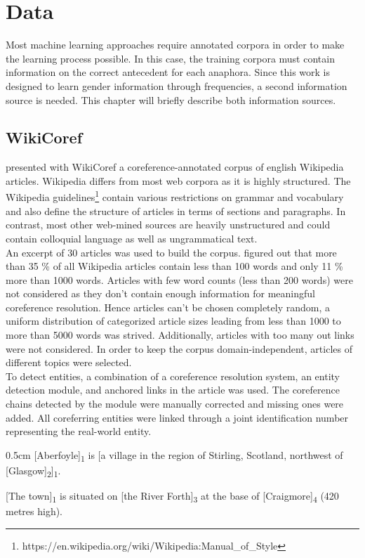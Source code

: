 \chapter{Data}
\label{sec:Data}

Most machine learning approaches require annotated corpora in order to make the learning process possible. In this case, the training corpora must contain information on the correct antecedent for each anaphora. Since this work is designed to learn gender information through frequencies, a second information source is needed. This chapter will briefly describe both information sources.

\section{WikiCoref }
\cite{wikicoref2016} presented with WikiCoref a coreference-annotated corpus of english Wikipedia articles. Wikipedia differs from most web corpora as it is highly structured. The Wikipedia guidelines\footnote{https://en.wikipedia.org/wiki/Wikipedia:Manual\_of\_Style} contain various restrictions on grammar and vocabulary and also define the structure of articles in terms of sections and paragraphs. In contrast, most other web-mined sources are heavily unstructured and could contain colloquial language as well as ungrammatical text. \\
An excerpt of 30 articles was used to build the corpus. \citep{wikicoref2016} figured out that more than 35 \% of all Wikipedia articles contain less than 100 words and only 11 \% more than 1000 words. Articles with few word counts (less than 200 words) were not considered as they don't contain enough information for meaningful coreference resolution. Hence articles can't be chosen completely random, a uniform distribution of categorized article sizes leading from less than 1000 to more than 5000 words was strived. Additionally, articles with too many out links were not considered. In order to keep the corpus domain-independent, articles of different topics were selected.\\

To detect entities, a combination of a coreference resolution system, an entity detection module, and anchored links in the article was used. The coreference chains detected by the module were manually corrected and missing ones were added. All coreferring entities were linked through a joint identification number representing the real-world entity.

\begin{addmargin}[0.5cm]{0.5cm}
[Aberfoyle]\textsubscript{1} is [a village in the region of Stirling, Scotland, northwest of [Glasgow]\textsubscript{2}]\textsubscript{1}.

[The town]\textsubscript{1} is situated on [the River Forth]\textsubscript{3} at the base of [Craigmore]\textsubscript{4} (420 metres high).
\end{addmargin}

